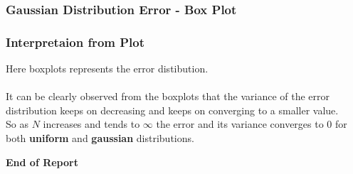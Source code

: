 \documentclass[a4paper]{article}
\begin{document}
\subsubsection{Gaussian Distribution Error - Box Plot}
\begin{figure}[H]
	\centering
	\begin{floatrow}
	\end{floatrow}
\end{figure}

\subsubsection{Interpretaion from Plot}
Here boxplots represents the error distibution. \\ \\
It can be clearly observed from the boxplots that the variance of the error distribution keeps on decreasing and keeps on converging to a smaller value.\\
So as $N$ increases and tends to $\infty$ the error and its variance converges to $0$ for both \textbf{uniform} and \textbf{gaussian} distributions.


\clearpage

\centering
{\Huge \textbf{End of Report}}
\end{document}
